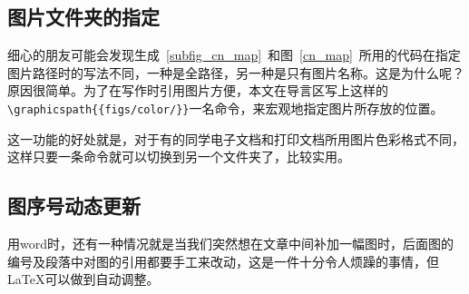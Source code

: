 \subsection{图片文件夹的指定}
细心的朋友可能会发现生成~\ref{subfig_cn_map}~和图~\ref{cn_map}~所用的代码在指定图片路径时的写法不同，一种是全路径，另一种是只有图片名称。这是为什么呢？原因很简单。为了在写作时引用图片方便，本文在导言区写上这样的\verb|\graphicspath{{figs/color/}}|一名命令，来宏观地指定图片所存放的位置。

这一功能的好处就是，对于有的同学电子文档和打印文档所用图片色彩格式不同，这样只要一条命令就可以切换到另一个文件夹了，比较实用。
\subsection{图序号动态更新}

用word时，还有一种情况就是当我们突然想在文章中间补加一幅图时，后面图的编号及段落中对图的引用都要手工来改动，这是一件十分令人烦躁的事情，但\LaTeX 可以做到自动调整。
